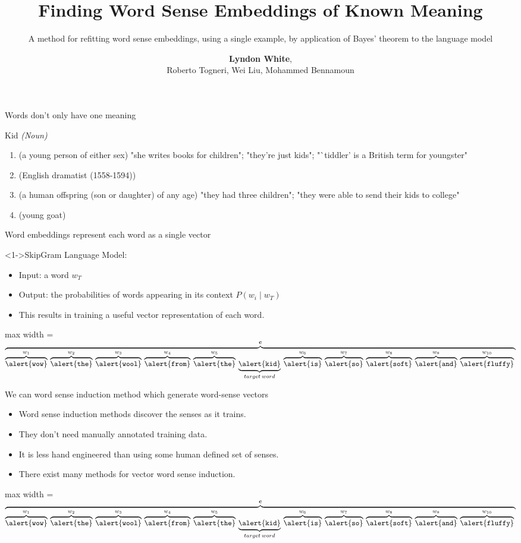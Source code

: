 \documentclass[dvipsnames]{beamer}
\author{\textbf{Lyndon White},\\ Roberto Togneri, Wei Liu, Mohammed Bennamoun}
\institute{School of Electical, Electronic and Computer Engineering\\The University of Western Australia}
\title{Finding Word Sense Embeddings of Known Meaning}
\subtitle{A method for refitting word sense embeddings,  using a single example, by application of Bayes' theorem to the language model}
\date{}
\newcommand{\fitmath}[1]{
	\begin{adjustbox}{max width = \textwidth}	
		$\displaystyle
		#1
		$
	\end{adjustbox}
}
\renewcommand{\c}{\mathbf{c}}
\newcommand{\ubraceword}[2]{\underbrace{\mathtt{\alert{#1}}}_{#2}\:}
\newcommand{\obraceword}[2]{\overbrace{\mathtt{\alert{#1}}}^{#2}\:}
\begin{document}
	
\newcommand{\sentexample}{\vfill\fitmath{
		\overbrace{
			\obraceword{wow}{w_1}
			\obraceword{the} {w_2}
			\obraceword{wool} {w_3}
			\obraceword{from} {w_4}
			\obraceword{the} {w_5}
			\ubraceword{kid} {target\: word}
			\obraceword{is} {w_6}
			\obraceword{so}{w_7}
			\obraceword{soft}{w_8}
			\obraceword{and} {w_9}
			\obraceword{fluffy}{w_{10}}
		}^{\c}
	}}
	

\frame{\maketitle}

\newcommand{\glosses}{
	\alert{Kid \emph{(Noun)}}
	\begin{enumerate}
		\item (a young person of either sex) "she writes books for children"; "they're just kids"; "`tiddler' is a British term for youngster"
		\item (English dramatist (1558-1594)) 
		\item (a human offspring (son or daughter) of any age) "they had three children"; "they were able to send their kids to college"
		\item (young goat) 
	\end{enumerate}
}


\begin{frame}{Words don't only have one meaning}
	\vspace{1em}
	\glosses
\end{frame}

\begin{frame}{Word embeddings represent each word as a single vector}
	\begin{block}<1->{SkipGram Language Model:}
		\begin{itemize}
			\item \alert{Input:} a word $w_T$
			\item \alert{Output:}  the probabilities of words appearing in its context
			 \alert{$P(w_i \mid w_T)$}
			\item This results in training a useful \alert{vector representation} of each word.
		\end{itemize}
	\end{block}
	
	\sentexample
\end{frame}


\begin{frame}{We can word sense induction method which generate word-sense vectors}
	\begin{itemize}
		\item Word sense induction methods \alert{discover the senses} as it trains.
		\item They don't need manually \alert{annotated} training data.
		\item It is less \alert{hand engineered} than using some human defined set of senses.
		\item There exist \alert{many methods} for vector word sense induction.
	\end{itemize}
	\sentexample
\end{frame}
\end{document}
